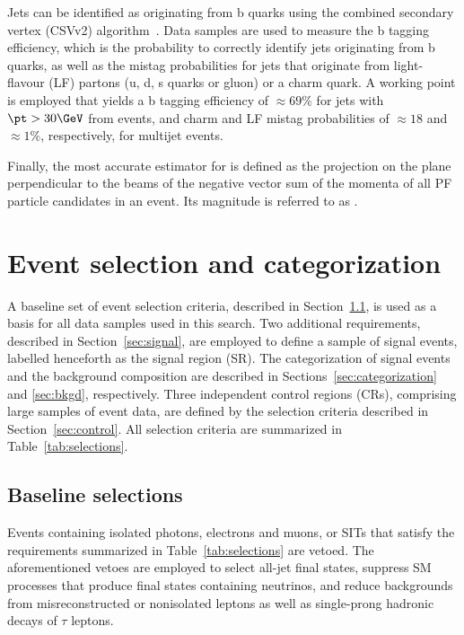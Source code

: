 Jets can be identified as originating from b quarks using the combined
secondary vertex (CSVv2) algorithm~\cite{BTV-16-002}.  Data samples
are used to measure the b tagging efficiency, which is the probability
to correctly identify jets originating from b quarks, as well as the
mistag probabilities for jets that originate from light-flavour (LF)
partons (u, d, s quarks or gluon) or a charm quark. A working point is
employed that yields a b tagging efficiency of ${\approx}69\%$ for
jets with $\pt > 30\GeV$ from \ttbar events, and charm and LF mistag
probabilities of ${\approx}18$ and ${\approx}1\%$, respectively, for
multijet events.

Finally, the most accurate estimator for \ptvecmiss is defined as the
projection on the plane perpendicular to the beams of the negative
vector sum of the momenta of all PF particle candidates in an
event. Its magnitude is referred to as \ptmiss.

\section{Event selection and categorization}
\label{sec:selection}

A baseline set of event selection criteria, described in
Section~\ref{sec:baseline}, is used as a basis for all data samples
used in this search. Two additional requirements, described in
Section~\ref{sec:signal}, are employed to define a sample of signal
events, labelled henceforth as the signal region (SR). The
categorization of signal events and the background composition are
described in Sections~\ref{sec:categorization} and \ref{sec:bkgd},
respectively. Three independent control regions (CRs), comprising
large samples of event data, are defined by the selection criteria
described in Section~\ref{sec:control}. All selection criteria are
summarized in Table~\ref{tab:selections}.

\subsection{Baseline selections}
\label{sec:baseline}

Events containing isolated photons, electrons and muons, or SITs that
satisfy the requirements summarized in Table~\ref{tab:selections} are
vetoed. The aforementioned vetoes are employed to select all-jet final
states, suppress SM processes that produce final states containing
neutrinos, and reduce backgrounds from misreconstructed or nonisolated
leptons as well as single-prong hadronic decays of $\tau$ leptons.

